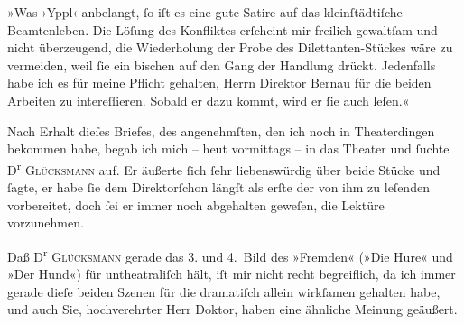 \pstart
           »Was ›Yppl‹ anbelangt, ſo iſt es eine gute
               Satire auf das kleinſtädtiſche Beamtenleben. Die Löſung des Konfliktes erſcheint mir
               freilich gewaltſam und nicht überzeugend, die Wiederholung der Probe des
               Dilettanten-Stückes wäre zu vermeiden, weil ſie ein bischen auf den Gang der Handlung
               drückt. Jedenfalls habe ich es für meine Pflicht gehalten, Herrn Direktor Bernau für die beiden Arbeiten zu intereſſieren.
               Sobald er dazu kommt, wird er ſie auch leſen.«\pend
           
\pstart
           Nach Erhalt dieſes Briefes, des angenehmſten, den ich noch in Theaterdingen bekommen
               habe, begab ich mich – heut vormittags – in das Theater und ſuchte D\textsuperscript{r}{ }\textsc{Glücksmann} auf. Er äußerte ſich ſehr liebenswürdig {\pb}über beide Stücke und ſagte, er habe ſie dem
                  Direktorſchon längſt als erſte der von ihm zu leſenden
               vorbereitet, doch ſei er immer noch abgehalten geweſen, die Lektüre vorzunehmen.\pend
           
\pstart
           Daß D\textsuperscript{r}{ }\textsc{Glücksmann} gerade das 3. und 4. Bild des »Fremden«
                  (»Die Hure« und »Der Hund«) für untheatraliſch
               hält, iſt mir nicht recht begreiflich, da ich immer gerade dieſe beiden Szenen für
               die dramatiſch allein wirkſamen gehalten habe, und auch Sie, hochverehrter Herr
               Doktor, haben eine ähnliche Meinung geäußert.\pend
           
